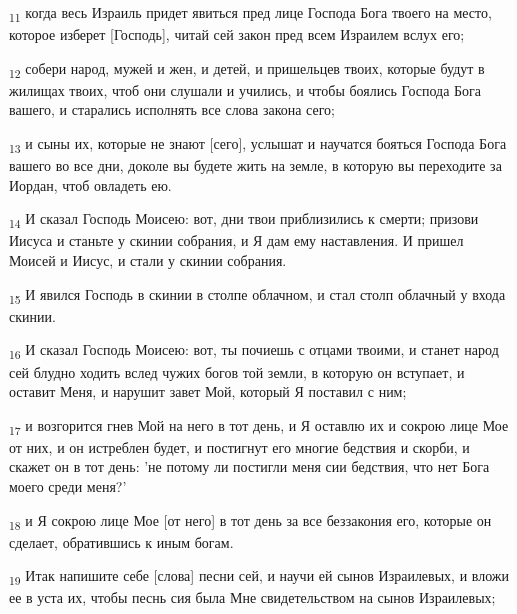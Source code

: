 \begin{tcolorbox}
\textsubscript{11} когда весь Израиль придет явиться пред лице Господа Бога твоего на место, которое изберет [Господь], читай сей закон пред всем Израилем вслух его;
\end{tcolorbox}
\begin{tcolorbox}
\textsubscript{12} собери народ, мужей и жен, и детей, и пришельцев твоих, которые будут в жилищах твоих, чтоб они слушали и учились, и чтобы боялись Господа Бога вашего, и старались исполнять все слова закона сего;
\end{tcolorbox}
\begin{tcolorbox}
\textsubscript{13} и сыны их, которые не знают [сего], услышат и научатся бояться Господа Бога вашего во все дни, доколе вы будете жить на земле, в которую вы переходите за Иордан, чтоб овладеть ею.
\end{tcolorbox}
\begin{tcolorbox}
\textsubscript{14} И сказал Господь Моисею: вот, дни твои приблизились к смерти; призови Иисуса и станьте у скинии собрания, и Я дам ему наставления. И пришел Моисей и Иисус, и стали у скинии собрания.
\end{tcolorbox}
\begin{tcolorbox}
\textsubscript{15} И явился Господь в скинии в столпе облачном, и стал столп облачный у входа скинии.
\end{tcolorbox}
\begin{tcolorbox}
\textsubscript{16} И сказал Господь Моисею: вот, ты почиешь с отцами твоими, и станет народ сей блудно ходить вслед чужих богов той земли, в которую он вступает, и оставит Меня, и нарушит завет Мой, который Я поставил с ним;
\end{tcolorbox}
\begin{tcolorbox}
\textsubscript{17} и возгорится гнев Мой на него в тот день, и Я оставлю их и сокрою лице Мое от них, и он истреблен будет, и постигнут его многие бедствия и скорби, и скажет он в тот день: 'не потому ли постигли меня сии бедствия, что нет Бога моего среди меня?'
\end{tcolorbox}
\begin{tcolorbox}
\textsubscript{18} и Я сокрою лице Мое [от него] в тот день за все беззакония его, которые он сделает, обратившись к иным богам.
\end{tcolorbox}
\begin{tcolorbox}
\textsubscript{19} Итак напишите себе [слова] песни сей, и научи ей сынов Израилевых, и вложи ее в уста их, чтобы песнь сия была Мне свидетельством на сынов Израилевых;
\end{tcolorbox}
